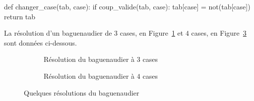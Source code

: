 \begin{blocvisible}[height=6]
    \begin{CodePythontexAlt}[TaillePolice=\large, Largeur=1\linewidth,Centre,Lignes=true,PremLigne=1]{}
def changer_case(tab, case):
    if coup_valide(tab, case):
        tab[case] = not(tab[case])
    return tab
    \end{CodePythontexAlt}
\end{blocvisible}

\pagebreak



La résolution d'un baguenaudier de $3$ cases, en Figure~\ref{exemplesresolutions3} et $4$ cases, en Figure~\ref{exemplesresolutions4} sont données ci-dessous.
\begin{center}
\begin{figure}[!h]
\centering\begin{subfigure}{6cm}
\newcommand{\Rvide}[2]{\draw(#1,#2) -- ++ (0.75,0) -- ++(0,0.75) -- ++(-0.75,0) -- cycle; \draw({#1+0.375},{#2+0.375}) circle(0.15);}
\newcommand{\Rplein}[2]{\draw(#1,#2) -- ++ (0.75,0) -- ++(0,0.75) -- ++(-0.75,0) -- cycle; \draw[fill=black] ({#1+0.375},{#2+0.375}) circle(0.15);}
\centering{}
\caption{Résolution du baguenaudier à $3$ cases}\label{exemplesresolutions3}
\end{subfigure}
\hspace{1cm}
\begin{subfigure}{9cm}
\newcommand{\Rvide}[2]{\draw(#1,#2) -- ++ (0.75,0) -- ++(0,0.75) -- ++(-0.75,0) -- cycle; \draw({#1+0.375},{#2+0.375}) circle(0.15);}
\newcommand{\Rplein}[2]{\draw(#1,#2) -- ++ (0.75,0) -- ++(0,0.75) -- ++(-0.75,0) -- cycle; \draw[fill=black] ({#1+0.375},{#2+0.375}) circle(0.15);}
\centering{}
\caption{Résolution du baguenaudier à $4$ cases}\label{exemplesresolutions4}
\end{subfigure}
\caption{Quelques résolutions du baguenaudier}
\end{figure}
\end{center}


